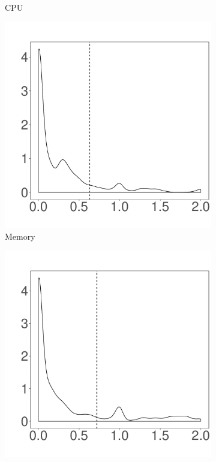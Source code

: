 \begin{figure}[t]
\begin{subfigure}{0.19\textwidth}
                \caption{CPU}
        \end{subfigure}%
        \begin{subfigure}{0.19\textwidth}
                \includegraphics[width=\linewidth]{Figures/mem-hadoop-cluster.pdf}
                \caption{Memory}
        \end{subfigure}%
        \begin{subfigure}{0.19\textwidth}
                \includegraphics[width=\linewidth]{Figures/ioread-hadoop-cluster.pdf}

\end{subfigure}
\end{figure}

